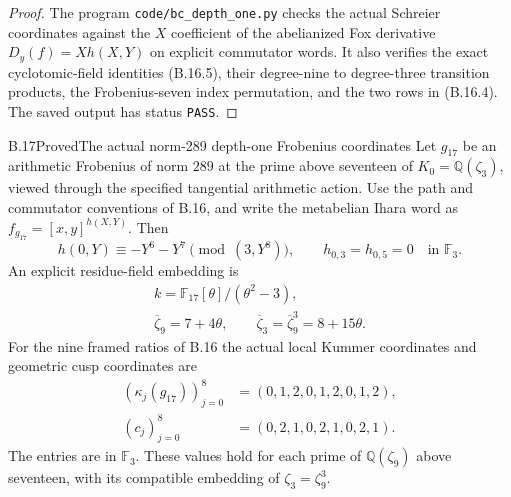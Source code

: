 \begin{proof}
The program \texttt{code/bc\_depth\_one.py} checks
the actual Schreier coordinates against the
$X$ coefficient of the abelianized Fox derivative
$D_y(f)=Xh(X,Y)$ on explicit commutator words.
It also verifies the exact cyclotomic-field
identities (B.16.5), their degree-nine to
degree-three transition products, the Frobenius-seven
index permutation, and the two rows in (B.16.4).
The saved output has status \texttt{PASS}.
\end{proof}

\begin{statement}{B.17}{Proved}{The actual norm-289 depth-one Frobenius coordinates}
Let $g_{17}$ be an arithmetic Frobenius of norm $289$
at the prime above seventeen of $K_0=\mathbb Q(\zeta_3)$,
viewed through the specified tangential arithmetic action.
Use the path and commutator conventions of B.16, and write
the metabelian Ihara word as
$f_{g_{17}}=[x,y]^{h(X,Y)}$.
Then
\[
 h(0,Y)\equiv-Y^6-Y^7\pmod{(3,Y^8)},
 \qquad h_{0,3}=h_{0,5}=0\quad\text{in }\mathbb F_3.
                                                               \tag{B.17.1}
\]
An explicit residue-field embedding is
\[
 \begin{gathered}
 k=\mathbb F_{17}[\theta]/(\theta^2-3),\\
 \overline\zeta_9=7+4\theta,\qquad
 \overline\zeta_3=\overline\zeta_9^3=8+15\theta.
 \end{gathered}
                                                               \tag{B.17.2}
\]
For the nine framed ratios of B.16 the actual local
Kummer coordinates and geometric cusp coordinates are
\[
 \begin{aligned}
 (\kappa_j(g_{17}))_{j=0}^8
       &=(0,1,2,0,1,2,0,1,2),\\
 (c_j)_{j=0}^8&=(0,2,1,0,2,1,0,2,1).
 \end{aligned}
                                                               \tag{B.17.3}
\]
The entries are in $\mathbb F_3$. These values hold for
each prime of $\mathbb Q(\zeta_9)$ above seventeen,
with its compatible embedding of $\zeta_3=\zeta_9^3$.
\end{statement}

